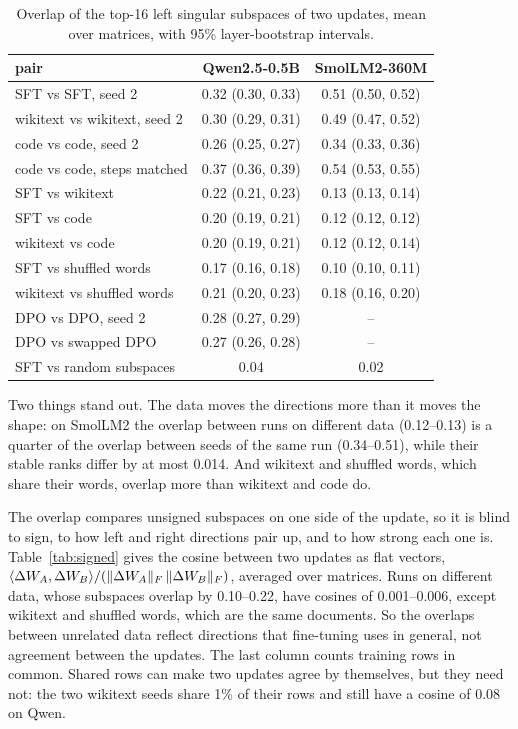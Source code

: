 \begin{table}[H]
\caption{Overlap of the top-16 left singular subspaces of two updates, mean
over matrices, with 95\% layer-bootstrap intervals.}
\label{tab:overlap}
\begin{center}
\small
\begin{tabular}{lcc}
\toprule
pair & Qwen2.5-0.5B & SmolLM2-360M \\
\midrule
SFT vs SFT, seed 2                & 0.32 (0.30, 0.33) & 0.51 (0.50, 0.52) \\
wikitext vs wikitext, seed 2      & 0.30 (0.29, 0.31) & 0.49 (0.47, 0.52) \\
code vs code, seed 2              & 0.26 (0.25, 0.27) & 0.34 (0.33, 0.36) \\
code vs code, steps matched       & 0.37 (0.36, 0.39) & 0.54 (0.53, 0.55) \\
\midrule
SFT vs wikitext                   & 0.22 (0.21, 0.23) & 0.13 (0.13, 0.14) \\
SFT vs code                       & 0.20 (0.19, 0.21) & 0.12 (0.12, 0.12) \\
wikitext vs code                  & 0.20 (0.19, 0.21) & 0.12 (0.12, 0.14) \\
SFT vs shuffled words             & 0.17 (0.16, 0.18) & 0.10 (0.10, 0.11) \\
wikitext vs shuffled words        & 0.21 (0.20, 0.23) & 0.18 (0.16, 0.20) \\
\midrule
DPO vs DPO, seed 2                & 0.28 (0.27, 0.29) & -- \\
DPO vs swapped DPO                & 0.27 (0.26, 0.28) & -- \\
\midrule
SFT vs random subspaces           & 0.04              & 0.02 \\
\bottomrule
\end{tabular}
\end{center}
\end{table}

Two things stand out. The data moves the directions more than it moves the
shape: on SmolLM2 the overlap between runs on different data (0.12--0.13) is a
quarter of the overlap between seeds of the same run (0.34--0.51), while their
stable ranks differ by at most 0.014. And wikitext and shuffled words, which
share their words, overlap more than wikitext and code do.

The overlap compares unsigned subspaces on one side of the update, so it is
blind to sign, to how left and right directions pair up, and to how strong each
one is. Table~\ref{tab:signed} gives the cosine between two updates as flat
vectors, $\langle\Delta W_A,\Delta W_B\rangle / (\|\Delta W_A\|_F\,\|\Delta W_B\|_F)$, averaged
over matrices. Runs on different data, whose subspaces overlap by 0.10--0.22,
have cosines of 0.001--0.006, except wikitext and shuffled words, which are the
same documents. So the overlaps between unrelated data reflect directions that
fine-tuning uses in general, not agreement between the updates. The last column
counts training rows in common. Shared rows can make two updates agree by
themselves, but they need not: the two wikitext seeds share 1\% of their rows
and still have a cosine of 0.08 on Qwen.

